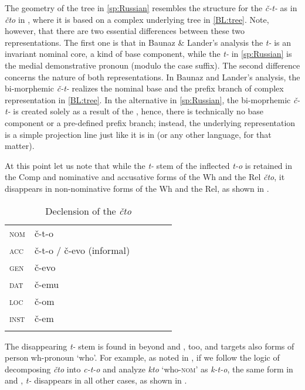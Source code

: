 The geometry of the tree in \ref{sp:Russian} resembles the structure for the  \textit{\v{c}-t-} as in  \textit{\v{c}to} in \cite{BaunazLander2018}, where it is based on a complex underlying tree in \ref{BL:tree}. Note, however, that there are two essential differences between these two representations. The first one is that in Baunaz \& Lander's analysis the  \textit{t-} is an invariant nominal core, a kind of base component, while the \textit{t-} in \ref{sp:Russian} is the medial demonstrative pronoun (modulo the case suffix). The second difference concerns the nature of both representations. In Baunaz and Lander's analysis, the bi-morphemic \textit{\v{c}-t-} realizes the nominal base and the prefix branch of complex representation in \ref{BL:tree}. In the alternative  in \ref{sp:Russian}, the bi-moprhemic \textit{\v{c}-t-} is created solely as a result of the , hence, there is technically no base component or a pre-defined prefix branch; instead, the underlying representation is a simple projection line just like it is in  (or any other language, for that matter).
\par At this point let us note that while the \textit{t-} stem of the inflected  \textit{t-o} is retained in the  Comp and nominative and accusative forms of the Wh and the Rel \textit{\v{c}to}, it disappears in non-nominative forms of the Wh and the Rel, as shown in .

\begin{table}
\caption{Declension of the  \textit{\v{c}to}}
\label{tab:ruskie} 
\begin{tabular}[t]{ l l l l l l }
\lsptoprule	
  \textsc{nom} & \v{c}-t-o\\
  \textsc{acc}  & \v{c}-t-o / \v{c}-evo (informal)\\
  \textsc{gen} & \v{c}-evo\\
  \textsc{dat} & \v{c}-emu\\
  \textsc{loc}  & \v{c}-om\\
  \textsc{inst} & \v{c}-em\\
  \lspbottomrule
\end{tabular}
\end{table}

\noindent The disappearing \textit{t-} stem is found in  beyond  and , too, and targets also forms of person wh-pronoun `who'. For example, as noted in \cite{Wiland-PSiCL}, if we follow the logic of decomposing \textit{\v{c}to} into \textit{c-t-o} and analyze \textit{kto} `who-\textsc{nom}' as \textit{k-t-o}, the same form in  and , \textit{t-} disappears in all other cases, as shown in .

